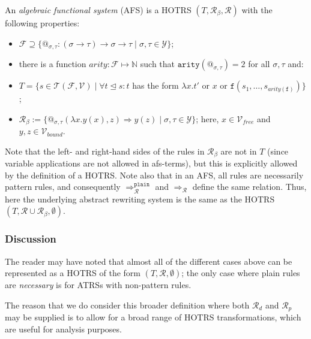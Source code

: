 \documentclass{lmcs}
\theoremstyle{theorem}\newtheorem{theorem}{Theorem}
\theoremstyle{theorem}\newtheorem{lemma}[theorem]{Lemma}
\theoremstyle{theorem}\newtheorem{corollary}[theorem]{Corollary}
\theoremstyle{definition}\newtheorem{definition}[theorem]{Definition}
\theoremstyle{definition}\newtheorem{example}[theorem]{Example}
\newcommand{\F}{\mathcal{F}}
\newcommand{\V}{\mathcal{V}}
\newcommand{\Vfree}{\mathcal{V}_{\mathit{free}}}
\newcommand{\Vbound}{\mathcal{V}_{\mathit{bound}}}
\newcommand{\Types}{\mathcal{Y}}
\newcommand{\Terms}{\mathcal{T}}
\newcommand{\Rules}{\mathcal{R}}
\newcommand{\identifier}[1]{\mathtt{#1}}
\newcommand{\afun}{\identifier{f}}
\newcommand{\avar}{x}
\newcommand{\bvar}{y}
\newcommand{\cvar}{z}
\newcommand{\abs}[2]{\lambda #1.#2}
\newcommand{\arity}{\mathit{arity}}
\newcommand{\arrtype}{\rightarrow}
\newcommand{\arrz}{\Rightarrow}
\newcommand{\arr}[1]{\arrz_{#1}}
\newcommand{\subtermeq}{\unlhd}
\newcommand{\mysubsection}[1]{\vspace{-12pt}\subsubsection{#1}}
\begin{document}
An \emph{algebraic functional system} (AFS) is a HOTRS $(T,\Rules_\beta,\Rules)$ with the
following properties:
\begin{itemize}
\item $\F \supseteq \{ @_{\sigma,\tau} : (\sigma \arrtype \tau) \arrtype \sigma \arrtype \tau
  \mid \sigma,\tau \in \Types \}$;
\item there is a function $\mathit{arity} : \F \mapsto \mathbb{N}$ such that
  $\mathtt{arity}(@_{\sigma,\tau}) = 2$ for all $\sigma,\tau$ and:
\item[] $T = \{ s \in \Terms(\F,\V) \mid \forall t \subtermeq s: t$ has the form
  $\abs{x}{t'}$ or $x$ or $\afun(s_1,\dots,s_{\arity(\afun)})\}$;
\item $\Rules_\beta := \{ @_{\sigma,\tau}(\abs{\avar}{\bvar(\avar)},\cvar) \arrz \bvar(\cvar)
  \mid \sigma,\tau \in \Types \}$; here, $\avar \in \Vfree$ and $\bvar,\cvar \in \Vbound$.
\end{itemize}
Note that the left- and right-hand sides of the rules in $\Rules_\beta$ are not in $T$ (since
variable applications are not allowed in afs-terms), but this is explicitly allowed by the
definition of a HOTRS. Note also that in an AFS, all rules are necessarily pattern rules, and
consequently $\arr{\Rules}^{\mathtt{plain}}$ and $\arr{\Rules}$ define the same relation.
Thus, here the underlying abstract rewriting system is the same as the HOTRS $(T,\Rules \cup
\Rules_\beta,\emptyset)$.

\mysubsection{Discussion} The reader may have noted that almost all of the different cases
above can be represented as a HOTRS of the form $(T,\Rules,\emptyset)$; the only case where
plain rules are \emph{necessary} is for ATRSs with non-pattern rules.

The reason that we do consider this broader definition where both $\Rules_d$ and $\Rules_p$ may
be supplied is to allow for a broad range of HOTRS transformations, which are useful for
analysis purposes.
\end{document}

